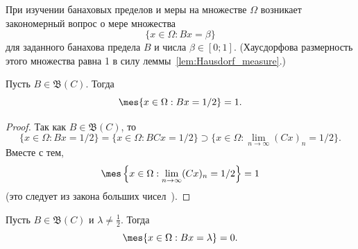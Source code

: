 При изучении банаховых пределов и меры на множестве $\Omega$
возникает закономерный вопрос о мере множества
\begin{equation}
	\{ x \in \Omega : Bx = \beta \}
\end{equation}
для заданного банахова предела $B$ и числа $\beta\in[0;1]$.
(Хаусдорфова размерность этого множества равна 1 в силу леммы~\ref{lem:Hausdorf_measure}.)

\begin{proposition}
	Пусть $B \in \mathfrak{B}(C)$.
	Тогда
	\begin{equation}
		\mes \{ x \in \Omega : Bx = 1/2 \} = 1
		.
	\end{equation}
\end{proposition}

\begin{proof}
	Так как $B \in \mathfrak{B}(C)$, то
	\begin{equation}
		\{ x \in \Omega : Bx = 1/2 \}
		=
		\{ x \in \Omega : BCx = 1/2 \}
		\supset
		\{ x \in \Omega : \lim_{n\to\infty} (Cx)_n = 1/2 \}
		.
	\end{equation}
	Вместе с тем,
	\begin{equation}
		\mes \left\{ x \in \Omega : \lim_{n\to\infty} (Cx)_n  = 1/2 \right\} = 1
	\end{equation}
	(это следует из закона больших чисел~\cite{connor1990almost}).
\end{proof}

\begin{corollary}
	Пусть $B \in \mathfrak{B}(C)$ и $\lambda \ne \frac 1 2$. Тогда
	\begin{equation}
		\mes \{ x \in \Omega : Bx = \lambda \} = 0
		.
	\end{equation}
\end{corollary}
